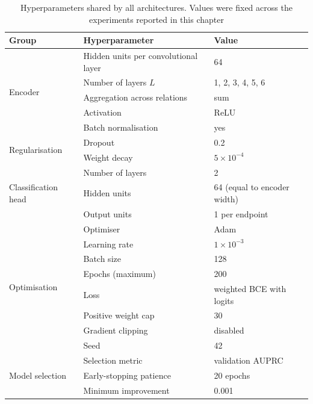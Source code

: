 \begin{table}[htbp]
  \centering
  \caption{Hyperparameters shared by all architectures. Values were fixed
    across the experiments reported in this chapter}
  \label{tab:hparams-common}
  \begin{tabular}{lll}
    \toprule
    Group & Hyperparameter & Value \\
    \midrule
    \multirow{5}{*}{Encoder}
      & Hidden units per convolutional layer & 64 \\
      & Number of layers $L$                 & 1, 2, 3, 4, 5, 6 \\
      & Aggregation across relations         & sum \\
      & Activation                           & ReLU \\
      & Batch normalisation                  & yes \\
    \midrule
    \multirow{2}{*}{Regularisation}
      & Dropout                              & 0.2 \\
      & Weight decay                         & $5\times10^{-4}$ \\
    \midrule
    \multirow{3}{*}{Classification head}
      & Number of layers                     & 2 \\
      & Hidden units                         & 64 (equal to encoder width) \\
      & Output units                         & 1 per endpoint \\
    \midrule
    \multirow{8}{*}{Optimisation}
      & Optimiser                            & Adam \\
      & Learning rate                        & $1\times10^{-3}$ \\
      & Batch size                           & 128 \\
      & Epochs (maximum)                     & 200 \\
      & Loss                                 & weighted BCE with logits \\
      & Positive weight cap                  & 30 \\
      & Gradient clipping                    & disabled \\
      & Seed                                 & 42 \\
    \midrule
    \multirow{3}{*}{Model selection}
      & Selection metric                     & validation AUPRC \\
      & Early-stopping patience              & 20 epochs \\
      & Minimum improvement                  & 0.001 \\
    \bottomrule
  \end{tabular}
\end{table}

